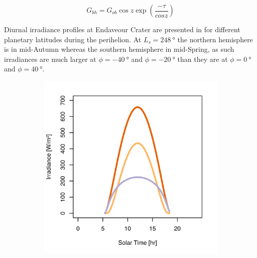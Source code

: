 \begin{equation}
  \label{eq:G_bh}
  G_{bh} = G_{ob}\cos{z}\exp\left(\frac{-\tau}{cos{z}}\right)
\end{equation}

Diurnal irradiance profiles at Endaveour Crater are presented in  for different planetary latitudes during the perihelion. At $L_{s} = \SI{248}{\degree}$ the northern hemisphere is in mid-Autumn whereas the southern hemisphere in mid-Spring, as such irradiances are much larger at $\phi = \SI{-40}{\degree}$ and $\phi = \SI{-20}{\degree}$ than they are at $\phi = \SI{0}{\degree}$ and $\phi = \SI{40}{\degree}$.

\begin{figure}[h]
\captionsetup[subfigure]{justification=centering}
	\centering
    \setlength{\subfigureWidth}{0.50\textwidth}
    \setlength{\graphicsHeight}{70mm}
    \hypersetup{hidelinks=true}%
  	\begin{subfigure}[t]{\subfigureWidth}
      \centering
  		\includegraphics[height=\graphicsHeight]{sections/mars-solar-energy/solar-radiation/plots/gh-gbh-gdh-variation-1-for-ls-248-phi-20-tau-05-and-albedo-027.png}

\end{subfigure}
\end{figure}
